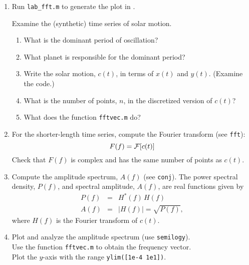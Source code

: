 \documentclass[11pt,titlepage,fleqn]{article}
\begin{document}
\begin{enumerate}

\item Run \verb+lab_fft.m+ to generate the plot in .

Examine the (synthetic) time series of solar motion.
%
\begin{enumerate}
\item What is the dominant period of oscillation?
\item What planet is responsible for the dominant period?
\item Write the solar motion, $c(t)$, in terms of $x(t)$ and $y(t)$. (Examine the code.)
\item What is the number of points, $n$, in the discretized version of $c(t)$? 
\item What does the function \verb+fftvec.m+ do?
\end{enumerate}


\item For the shorter-length time series, compute the Fourier transform (see \verb+fft+):
%
\begin{equation*}
F(f) = \mbox{$\cal F$}[c(t)]
\end{equation*}
%
Check that $F(f)$ is complex and has the same number of points as $c(t)$.


\item  Compute the amplitude spectrum, $A(f)$ (see \verb+conj+).
The power spectral density, $P(f)$, and spectral amplitude, $A(f)$, are real functions given by
%
\begin{eqnarray*}
P(f) &=& H^{*}(f)\,H(f)
\\
A(f) &=& |H(f)| = \sqrt{P(f)},
\end{eqnarray*}
%
where $H(f)$ is the Fourier transform of $c(t)$.


\item Plot and analyze the amplitude spectrum (use \verb+semilogy+). \\
Use the function \verb+fftvec.m+ to obtain the frequency vector. \\
Plot the $y$-axis with the range \verb+ylim([1e-4 1e1])+.



\end{enumerate}
\end{document}
